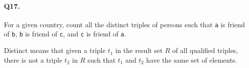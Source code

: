\paragraph{Q17.}

For a given country, count all the distinct triples of persons such that
\texttt{a} is friend of \texttt{b}, \texttt{b} is friend of \texttt{c},
and \texttt{c} is friend of \texttt{a}.

Distinct means that given a triple \(t_1\) in the result set \(R\) of
all qualified triples, there is not a triple \(t_2\) in \(R\) such that
\(t_1\) and \(t_2\) have the same set of elements.
